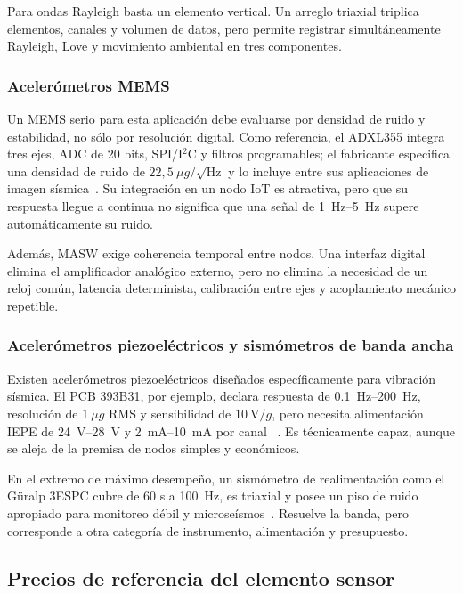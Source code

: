 Para ondas Rayleigh basta un elemento vertical. Un arreglo triaxial triplica elementos,
canales y volumen de datos, pero permite registrar simultáneamente Rayleigh, Love y
movimiento ambiental en tres componentes.

\subsubsection{Acelerómetros MEMS}

Un MEMS serio para esta aplicación debe evaluarse por densidad de ruido y estabilidad,
no sólo por resolución digital. Como referencia, el ADXL355 integra tres ejes, ADC de 20
bits, SPI/I$^2$C y filtros programables; el fabricante especifica una densidad de ruido
de $22{,}5~\mu g/\sqrt{\mathrm{Hz}}$ y lo incluye entre sus aplicaciones de imagen
sísmica~\cite{AnalogDevicesADXL355}. Su integración en un nodo IoT es atractiva, pero que
su respuesta llegue a continua no significa que una señal de \SIrange{1}{5}{\hertz}
supere automáticamente su ruido.

Además, MASW exige coherencia temporal entre nodos. Una interfaz digital elimina el
amplificador analógico externo, pero no elimina la necesidad de un reloj común, latencia
determinista, calibración entre ejes y acoplamiento mecánico repetible.

\subsubsection{Acelerómetros piezoeléctricos y sismómetros de banda ancha}

Existen acelerómetros piezoeléctricos diseñados específicamente para vibración sísmica.
El PCB 393B31, por ejemplo, declara respuesta de \SIrange{0.1}{200}{\hertz}, resolución
de $1~\mu g$ RMS y sensibilidad de $10~\mathrm{V}/g$, pero necesita alimentación
IEPE de \SIrange{24}{28}{\volt} y \SIrange{2}{10}{\milli\ampere} por canal
~\cite{PCB393B31}. Es técnicamente capaz, aunque se aleja de la premisa de nodos simples
y económicos.

En el extremo de máximo desempeño, un sismómetro de realimentación como el Güralp 3ESPC
cubre de 60 s a \SI{100}{\hertz}, es triaxial y posee un piso de ruido apropiado para
monitoreo débil y microseísmos~\cite{Guralp3ESPC}. Resuelve la banda, pero corresponde a
otra categoría de instrumento, alimentación y presupuesto.

\subsection{Precios de referencia del elemento sensor}


